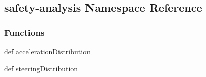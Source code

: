 \hypertarget{namespacesafety-analysis}{\subsection{safety-\/analysis Namespace Reference}
\label{namespacesafety-analysis}
}
\subsubsection*{Functions}
\begin{DoxyCompactItemize}
\item 
def \hyperlink{namespacesafety-analysis_a4835cb64b2253634ecf8a1b9c338c787}{acceleration\-Distribution}
\item 
def \hyperlink{namespacesafety-analysis_acde6413c5a80f3a5a92c7e58451545a7}{steering\-Distribution}
\end{DoxyCompactItemize}
